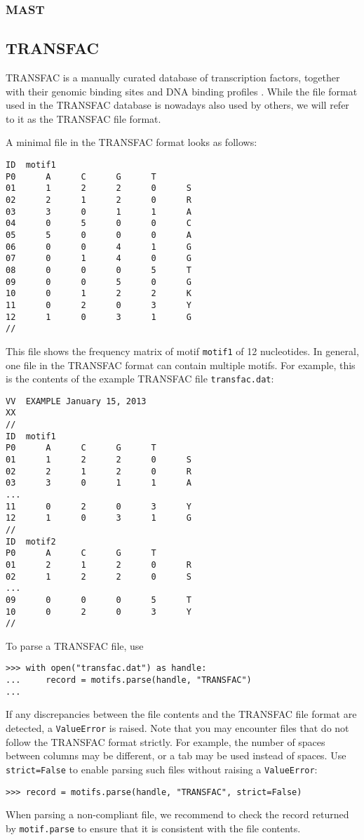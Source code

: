 \subsubsection*{MAST}

\subsection{TRANSFAC}

TRANSFAC is a manually curated database of transcription factors, together
with their genomic binding sites and DNA binding profiles \cite{matys2003}.
While the file format used in the TRANSFAC database is nowadays also used
by others, we will refer to it as the TRANSFAC file format.

A minimal file in the TRANSFAC format looks as follows:
\begin{verbatim}
ID  motif1
P0      A      C      G      T
01      1      2      2      0      S
02      2      1      2      0      R
03      3      0      1      1      A
04      0      5      0      0      C
05      5      0      0      0      A
06      0      0      4      1      G
07      0      1      4      0      G
08      0      0      0      5      T
09      0      0      5      0      G
10      0      1      2      2      K
11      0      2      0      3      Y
12      1      0      3      1      G
//
\end{verbatim}
This file shows the frequency matrix of motif \verb+motif1+ of 12 nucleotides.
In general, one file in the TRANSFAC format can contain multiple motifs. For
example, this is the contents of the example TRANSFAC file \verb+transfac.dat+:
\begin{verbatim}
VV  EXAMPLE January 15, 2013
XX
//
ID  motif1
P0      A      C      G      T
01      1      2      2      0      S
02      2      1      2      0      R
03      3      0      1      1      A
...
11      0      2      0      3      Y
12      1      0      3      1      G
//
ID  motif2
P0      A      C      G      T
01      2      1      2      0      R
02      1      2      2      0      S
...
09      0      0      0      5      T
10      0      2      0      3      Y
//
\end{verbatim}
To parse a TRANSFAC file, use

\begin{verbatim}
>>> with open("transfac.dat") as handle:
...     record = motifs.parse(handle, "TRANSFAC")
...
\end{verbatim}
If any discrepancies between the file contents and the TRANSFAC file format are detected, a \verb+ValueError+ is raised. Note that you may encounter files that do not follow the TRANSFAC format strictly. For example, the number of spaces between columns may be different, or a tab may be used instead of spaces. Use \verb+strict=False+ to enable parsing such files without raising a \verb+ValueError+:
\begin{verbatim}
>>> record = motifs.parse(handle, "TRANSFAC", strict=False)
\end{verbatim}
When parsing a non-compliant file, we recommend to check the record returned by \verb+motif.parse+ to ensure that it is consistent with the file contents.

